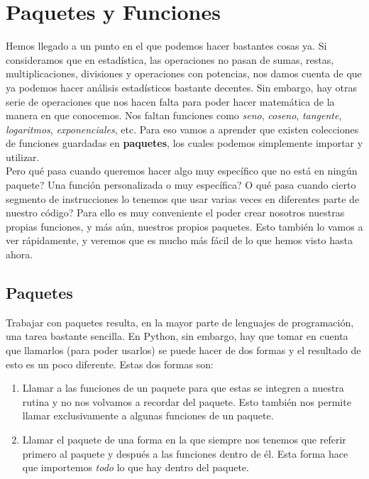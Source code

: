 \documentclass[10pt,letterpaper]{article}
\begin{document}
\section{Paquetes y Funciones}
Hemos llegado a un punto en el que podemos hacer bastantes cosas ya. Si consideramos que en estad\'istica, las operaciones no pasan de sumas, restas, multiplicaciones, divisiones y operaciones con potencias, nos damos cuenta de que ya podemos hacer an\'alisis estad\'isticos bastante decentes. Sin embargo, hay otras serie de operaciones que nos hacen falta para poder hacer matem\'atica de la manera en que conocemos. Nos faltan funciones como \emph{seno}, \emph{coseno}, \emph{tangente}, \emph{logaritmos}, \emph{exponenciales}, etc. Para eso vamos a aprender que existen colecciones de funciones guardadas en \textbf{paquetes}, los cuales podemos simplemente importar y utilizar.\\

Pero qu\'e pasa cuando queremos hacer algo muy espec\'ifico que no est\'a en ning\'un paquete? Una funci\'on personalizada o muy espec\'ifica? O qu\'e pasa cuando cierto segmento de instrucciones lo tenemos que usar varias veces en diferentes parte de nuestro c\'odigo? Para ello es muy conveniente el poder crear nosotros nuestras propias funciones, y m\'as a\'un, nuestros propios paquetes. Esto tambi\'en lo vamos a ver r\'apidamente, y veremos que es mucho m\'as f\'acil de lo que hemos visto hasta ahora.

\subsection{Paquetes}
Trabajar con paquetes resulta, en la mayor parte de lenguajes de programaci\'on, una tarea bastante sencilla. En Python, sin embargo, hay que tomar en cuenta que llamarlos (para poder usarlos) se puede hacer de dos formas y el resultado de esto es un poco diferente. Estas dos formas son:

\begin{enumerate}
\item Llamar a las funciones de un paquete para que estas se integren a nuestra rutina y no nos volvamos a recordar del paquete. Esto tambi\'en nos permite llamar exclusivamente a algunas funciones de un paquete.
\item Llamar el paquete de una forma en la que siempre nos tenemos que referir primero al paquete y despu\'es a las funciones dentro de \'el. Esta forma hace que importemos \emph{todo} lo que hay dentro del paquete.
\end{enumerate}
\end{document}
